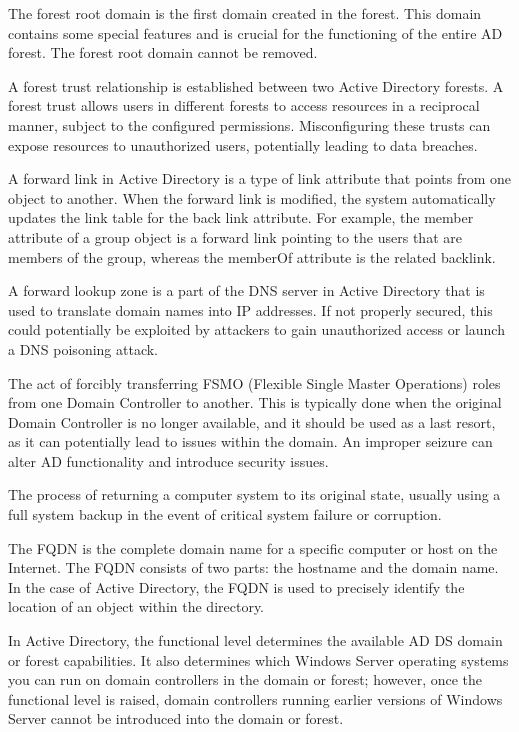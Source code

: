  The forest root domain is the first domain created in the forest. This domain contains some special features and is crucial for the functioning of the entire AD forest. The forest root domain cannot be removed.

 A forest trust relationship is established between two Active Directory forests. A forest trust allows users in different forests to access resources in a reciprocal manner, subject to the configured permissions. Misconfiguring these trusts can expose resources to unauthorized users, potentially leading to data breaches.

 A forward link in Active Directory is a type of link attribute that points from one object to another. When the forward link is modified, the system automatically updates the link table for the back link attribute. For example, the member attribute of a group object is a forward link pointing to the users that are members of the group, whereas the memberOf attribute is the related backlink.

 A forward lookup zone is a part of the DNS server in Active Directory that is used to translate domain names into IP addresses. If not properly secured, this could potentially be exploited by attackers to gain unauthorized access or launch a DNS poisoning attack.

 The act of forcibly transferring FSMO (Flexible Single Master Operations) roles from one Domain Controller to another. This is typically done when the original Domain Controller is no longer available, and it should be used as a last resort, as it can potentially lead to issues within the domain. An improper seizure can alter AD functionality and introduce security issues.

 The process of returning a computer system to its original state, usually using a full system backup in the event of critical system failure or corruption.

 The FQDN is the complete domain name for a specific computer or host on the Internet. The FQDN consists of two parts: the hostname and the domain name. In the case of Active Directory, the FQDN is used to precisely identify the location of an object within the directory.

 In Active Directory, the functional level determines the available AD DS domain or forest capabilities. It also determines which Windows Server operating systems you can run on domain controllers in the domain or forest; however, once the functional level is raised, domain controllers running earlier versions of Windows Server cannot be introduced into the domain or forest.

